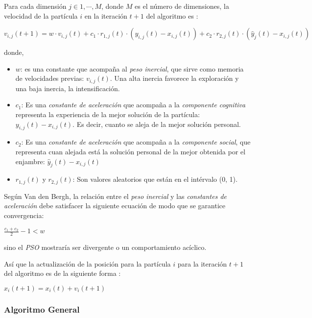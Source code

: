     Para cada dimensión $j \in {1, \cdots, M}$, donde $M$ es el número de
dimensiones, la velocidad de la partícula $i$ en la iteración $t + 1$ del
algoritmo es \cite{PSO_0}:
\begin{center}
$v_{i,j}(t + 1) = w \cdot v_{i,j}(t) + c_1 \cdot r_{1,j}(t) \cdot (y_{i,j}(t) - x_{i,j}(t)) + c_2 \cdot r_{2,j}(t) \cdot (\hat{y}_j(t) - x_{i,j}(t))$
\end{center}
donde,
\begin{itemize}
    \item $w$: es una constante que acompaña al \emph{peso inercial}, que sirve
como memoria de velocidades previas: $v_{i,j}(t)$. Una alta inercia favorece la
exploración y una baja inercia, la intensificación.
    \item $c_1$: Es una \emph{constante de aceleración} que acompaña a la
\emph{componente cognitiva} representa la experiencia de la mejor solución de
la partícula: $y_{i,j} (t) - x_{i,j}(t)$. Es decir, cuanto se aleja de la mejor
solución personal.
    \item $c_2$: Es una \emph{constante de aceleración} que acompaña a la
\emph{componente social}, que representa cuan alejada está la solución personal
de la mejor obtenida por el enjambre: $\hat{y}_j(t)-x_{i,j}(t)$
    \item $r_{1,j}(t)$ y $r_{2,j}(t)$: Son valores aleatorios que están en el
intérvalo (0, 1).
\end{itemize}

    Según Van den Bergh\cite{PSO_3}, la relación entre el \emph{peso inercial} y
las \emph{constantes de aceleración} debe satisfacer la siguiente ecuación de modo que
se garantice convergencia:
\begin{center}
$\displaystyle\frac{c_1 + c_2}{2} - 1 < w$
\end{center}
sino el \emph{PSO} mostraría ser divergente o un comportamiento acíclico.

    Así que la actualización de la posición para la partícula $i$ para la
iteración $t + 1$ del algoritmo es de la siguiente forma \cite{PSO_0}:
\begin{center}
$x_i(t + 1) = x_i(t) + v_i(t + 1)$
\end{center}

\subsubsection{Algoritmo General}


